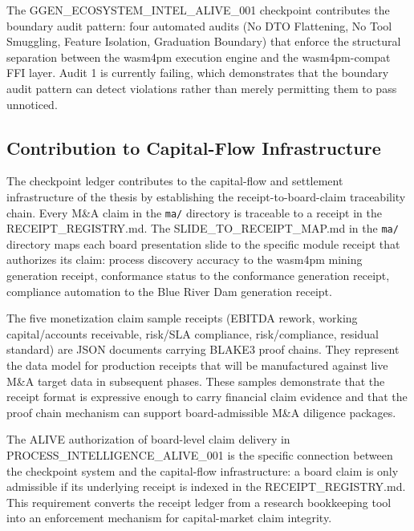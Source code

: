 The GGEN\_ECOSYSTEM\_INTEL\_ALIVE\_001 checkpoint contributes the boundary audit pattern: four
automated audits (No DTO Flattening, No Tool Smuggling, Feature Isolation, Graduation Boundary)
that enforce the structural separation between the wasm4pm execution engine and the wasm4pm-compat
FFI layer. Audit 1 is currently failing, which demonstrates that the boundary audit pattern can
detect violations rather than merely permitting them to pass unnoticed.

\subsection{Contribution to Capital-Flow Infrastructure}
\label{sec:checkpoints-contribution-capital-flow}

The checkpoint ledger contributes to the capital-flow and settlement infrastructure of the thesis
by establishing the receipt-to-board-claim traceability chain. Every M\&A claim in the \texttt{ma/}
directory is traceable to a receipt in the RECEIPT\_REGISTRY.md. The SLIDE\_TO\_RECEIPT\_MAP.md in
the \texttt{ma/} directory maps each board presentation slide to the specific module receipt that
authorizes its claim: process discovery accuracy to the wasm4pm mining generation receipt, conformance
status to the conformance generation receipt, compliance automation to the Blue River Dam generation
receipt.

The five monetization claim sample receipts (EBITDA rework, working capital/accounts receivable,
risk/SLA compliance, risk/compliance, residual standard) are JSON documents carrying BLAKE3 proof
chains. They represent the data model for production receipts that will be manufactured against
live M\&A target data in subsequent phases. These samples demonstrate that the receipt format is
expressive enough to carry financial claim evidence and that the proof chain mechanism can support
board-admissible M\&A diligence packages.

The ALIVE authorization of board-level claim delivery in PROCESS\_INTELLIGENCE\_ALIVE\_001 is the
specific connection between the checkpoint system and the capital-flow infrastructure: a board claim
is only admissible if its underlying receipt is indexed in the RECEIPT\_REGISTRY.md. This requirement
converts the receipt ledger from a research bookkeeping tool into an enforcement mechanism for
capital-market claim integrity.
